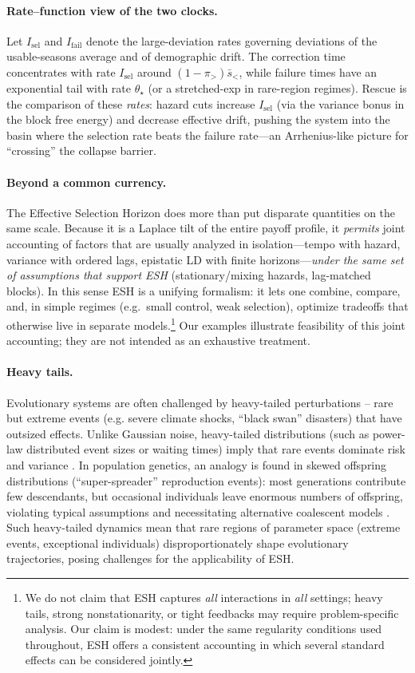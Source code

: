 \documentclass[11pt]{article}
\theoremstyle{upright}
\begin{document}
\paragraph{Rate–function view of the two clocks.}
Let $I_{\mathrm{sel}}$ and $I_{\mathrm{fail}}$ denote the large-deviation rates governing deviations of the
usable-seasons average and of demographic drift. The correction time concentrates with rate $I_{\mathrm{sel}}$
around $(1-\pi_{>})\bar s_{<}$, while failure times have an exponential tail with rate $\theta_\star$ (or a stretched-exp
in rare-region regimes). Rescue is the comparison of these \emph{rates}: hazard cuts increase $I_{\mathrm{sel}}$
(via the variance bonus in the block free energy) and decrease effective drift, pushing the system into the basin where
the selection rate beats the failure rate—an Arrhenius-like picture for “crossing” the collapse barrier.

\paragraph{Beyond a common currency.}
The Effective Selection Horizon does more than put disparate quantities on the same scale.
Because it is a Laplace tilt of the entire payoff profile, it \emph{permits} joint accounting of
factors that are usually analyzed in isolation—tempo with hazard, variance with ordered lags,
epistatic LD with finite horizons—\emph{under the same set of assumptions that support ESH}
(stationary/mixing hazards, lag-matched blocks). In this sense ESH is a unifying formalism:
it lets one combine, compare, and, in simple regimes (e.g.\ small control, weak selection),
optimize tradeoffs that otherwise live in separate models.\footnote{We do not claim that ESH captures \emph{all} interactions in \emph{all}
settings; heavy tails, strong nonstationarity, or tight feedbacks may require problem-specific analysis.
Our claim is modest: under the same regularity conditions used throughout, ESH offers a consistent
accounting in which several standard effects can be considered jointly.} Our examples illustrate feasibility
of this joint accounting; they are not intended as an exhaustive treatment.

\paragraph{Heavy tails.}
Evolutionary systems are often challenged by heavy-tailed perturbations – rare but extreme events (e.g. severe climate shocks, “black swan” disasters) that have outsized effects. Unlike Gaussian noise, heavy-tailed distributions (such as power-law distributed event sizes or waiting times) imply that rare events dominate risk and variance \citep{Halley1996}. In population genetics, an analogy is found in skewed offspring distributions (“super-spreader” reproduction events): most generations contribute few descendants, but occasional individuals leave enormous numbers of offspring, violating typical assumptions and necessitating alternative coalescent models \citep{Eldon2006}. Such heavy-tailed dynamics mean that rare regions of parameter space (extreme events, exceptional individuals) disproportionately shape evolutionary trajectories, posing challenges for the applicability of ESH.
\end{document}
